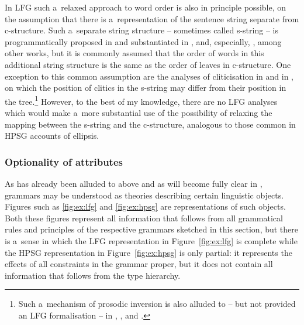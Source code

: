 \documentclass[output=paper,hidelinks]{langscibook}
\begin{document}
In LFG such a~relaxed approach to word order is also in principle possible, on the assumption that there is a~representation of the sentence string separate from c-structure.  Such a~separate string structure -- sometimes called s-string \citep[Section {3.5}]{DLM:LFG} -- is programmatically proposed in \citet{kaplan1987three} and substantiated in \citet{wescoat2002}, \citet{asud:09} and, especially, \citet{DM11}, among other works, but it is commonly assumed that the order of words in this additional string structure is the same as the order of leaves in c-structure.  One exception to this common assumption are the analyses of cliticisation in \citet{boegel-etal2010} and in \citet{lowe:16a}, on which the position of clitics in the s-string may differ from their position in the tree.\footnote{Such a~mechanism of prosodic inversion is also alluded to -- but not provided an LFG formalisation -- in \citet[69]{Simpson1991}, \citet[140]{Kroeger93}, and \citet[226]{AustBres96}.}  However, to the best of my knowledge, there are no LFG analyses which would make a~more substantial use of the possibility of relaxing the mapping between the s-string and the c-structure, analogous to those common in HPSG accounts of ellipsis.

\subsubsection{Optionality of attributes}
\label{sec:gram:opt}

As has already been alluded to above and as will become fully clear in , grammars may be understood as theories describing certain linguistic objects. Figures such as \ref{fig:ex:lfg} and \ref{fig:ex:hpsg} are representations of such objects. Both these figures represent all information that follows from all grammatical rules and principles of the respective grammars sketched in this section, but there is a~sense in which the LFG representation in Figure~\ref{fig:ex:lfg} is complete while the HPSG representation in Figure~\ref{fig:ex:hpsg} is only partial: it represents the effects of all constraints in the grammar proper, but it does not contain all information that follows from the type hierarchy.
\end{document}
